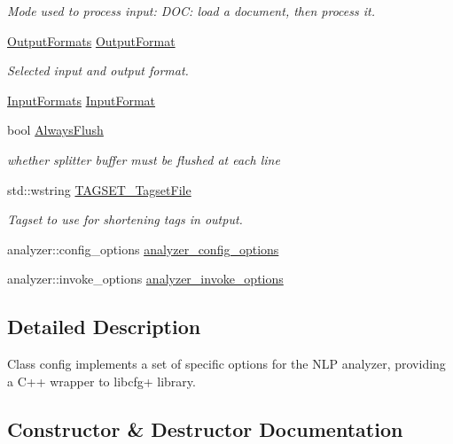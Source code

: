 \begin{DoxyCompactItemize}
\begin{DoxyCompactList}\small\item\em Mode used to process input\+: D\+O\+C\+: load a document, then process it. \end{DoxyCompactList}\item 
\hyperlink{config_8h_a3f8677a5e7c7cdae9eae3f84e38bd5bd}{Output\+Formats} \hyperlink{classconfig_a79e21d6098e5fd1bfe615e2fef84a99f}{Output\+Format}
\begin{DoxyCompactList}\small\item\em Selected input and output format. \end{DoxyCompactList}\item 
\hyperlink{config_8h_aa29a34e3d6e44b1b5d909fb8cfcfdfb6}{Input\+Formats} \hyperlink{classconfig_ab66ebbcc7f73de39355cdf724cd644e6}{Input\+Format}
\item 
bool \hyperlink{classconfig_a604dde733e96d20cb065e2d39f8fe0e7}{Always\+Flush}
\begin{DoxyCompactList}\small\item\em whether splitter buffer must be flushed at each line \end{DoxyCompactList}\item 
std\+::wstring \hyperlink{classconfig_a6f42f7c1c60685d9b223fa9dc717a947}{T\+A\+G\+S\+E\+T\+\_\+\+Tagset\+File}
\begin{DoxyCompactList}\small\item\em Tagset to use for shortening tags in output. \end{DoxyCompactList}\item 
analyzer\+::config\+\_\+options \hyperlink{classconfig_a41502293ebef90c329451672bd879764}{analyzer\+\_\+config\+\_\+options}
\item 
analyzer\+::invoke\+\_\+options \hyperlink{classconfig_a0e4c6bbdd48bd59be36052970af2abff}{analyzer\+\_\+invoke\+\_\+options}
\end{DoxyCompactItemize}


\subsection{Detailed Description}
Class config implements a set of specific options for the N\+L\+P analyzer, providing a C++ wrapper to libcfg+ library. 

\subsection{Constructor \& Destructor Documentation}
\hypertarget{classconfig_afe4a0fda7bf097bd04d713c06797e1f1}{}
